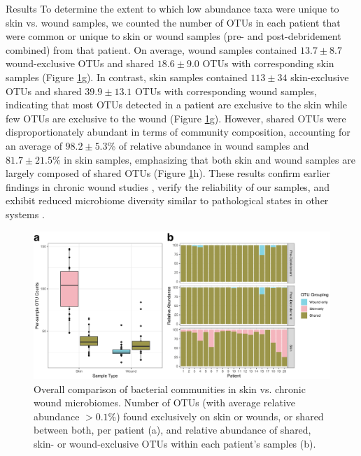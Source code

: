 \documentclass[oneside,12pt,final]{sty/ucthesis-CA2012}
\begin{document}
\begin{mainmatter}
\begin{section}{Results}
To determine the extent to which low abundance taxa were unique to skin vs. wound samples, we counted the number of OTUs in each patient that were common or unique to skin or wound samples (pre- and post-debridement combined) from that patient. On average, wound samples contained $13.7 \pm 8.7$ wound-exclusive OTUs and shared $18.6 \pm 9.0$ OTUs with corresponding skin samples (Figure \ref{fig:S4GH}g). In contrast, skin samples contained $113 \pm 34$ skin-exclusive OTUs and shared $39.9 \pm 13.1$ OTUs with corresponding wound samples, indicating that most OTUs detected in a patient are exclusive to the skin while few OTUs are exclusive to the wound (Figure \ref{fig:S4GH}g). However, shared OTUs were disproportionately abundant in terms of community composition, accounting for an average of $98.2\pm5.3$\% of relative abundance in wound samples and $81.7 \pm 21.5$\% in skin samples, emphasizing that both skin and wound samples are largely composed of shared OTUs (Figure \ref{fig:S4GH}h). These results confirm earlier findings in chronic wound studies \cite{RN6, RN7, RN8, RN36}, verify the reliability of our samples, and exhibit reduced microbiome diversity similar to pathological states in other systems \cite{RN9, RN97, RN37}. 

\begin{figure}
\centering
\centerline{\includegraphics[width=\textwidth]{fig/C3figS4GH.pdf}}
\caption{Overall comparison of bacterial communities in skin vs. chronic wound microbiomes. Number of OTUs (with average relative abundance $>0.1$\%) found exclusively on skin or wounds, or shared between both, per patient (a), and relative abundance of shared, skin- or wound-exclusive OTUs within each patient's samples (b).}
\label{fig:S4GH}
\end{figure} 


\end{section}
\end{mainmatter}
\end{document}

